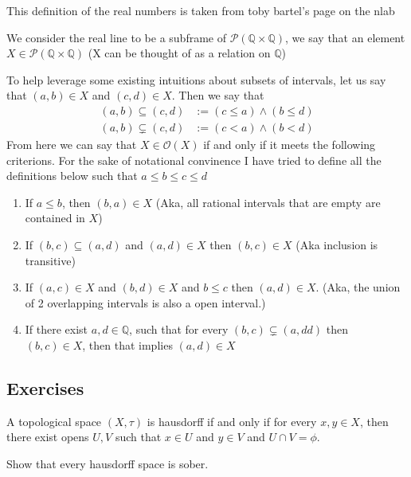 This definition of the real numbers is taken from toby bartel's page on the nlab
\begin{definition}
    We consider the real line to be a subframe of $\mathcal{P}(\mathbb{Q} \times \mathbb{Q})$, we say that an element $X \in \mathcal{P}(\mathbb{Q} \times \mathbb{Q})$ (X can be thought of as a relation on $\mathbb{Q}$)

    To help leverage some existing intuitions about subsets of intervals, let us say that $(a,b) \in X$ and $(c,d) \in X$. Then we say that
    \begin{align*}
        (a,b) \subseteq (c,d) &:= (c \leq a) \wedge (b \leq d)\\ 
        (a,b) \subsetneq (c,d) &:= (c < a) \wedge (b < d)
    \end{align*}
    From here we can say that $X \in \mathcal{O}(X)$ if and only if it meets the following criterions. For the sake of notational convinence I have tried to define all the definitions below such that $a \leq b \leq c \leq d$
    \begin{enumerate}
        \item If $a \leq b$, then $(b,a) \in X$ (Aka, all rational intervals that are empty are contained in $X$)
        \item If $(b,c) \subseteq (a,d)$ and $(a,d) \in X$ then $(b,c) \in X$ (Aka inclusion is transitive)
        \item If $(a,c) \in X$ and $(b,d) \in X$ and $b \leq c$ then $(a,d) \in X$. (Aka, the union of 2 overlapping intervals is also a open interval.)
        \item If there exist $a,d \in \mathbb{Q}$, such that for every $(b,c) \subsetneq (a,dd)$ then $(b,c) \in X$, then that implies $(a,d) \in X$
    \end{enumerate}
\end{definition}


\subsection{Exercises}

\begin{Exercise}
    A topological space $(X,\tau)$ is hausdorff if and only if for every $x,y \in X$, then there exist opens $U,V$ such that $x \in U$ and $y \in V$ and $U \cap V = \phi$.

    Show that every hausdorff space is sober.
\end{Exercise}